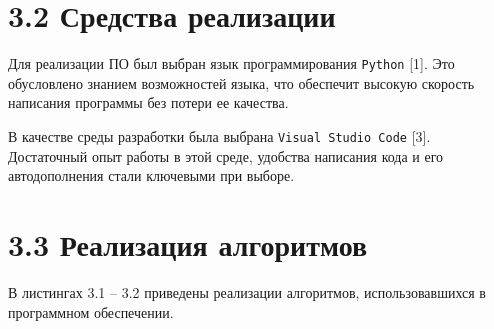 \documentclass[12pt, a4paper]{report}
\begin{document}
	\section*{3.2 Средства реализации}
	
	Для реализации ПО был выбран язык программирования \verb|Python| [1]. Это обусловлено знанием возможностей языка, что обеспечит высокую скорость написания программы без потери ее качества. 
	
	В качестве среды разработки была выбрана \verb|Visual Studio Code| [3]. Достаточный опыт работы в этой среде, удобства написания кода и его автодополнения стали ключевыми при выборе.
	
	\section*{3.3 Реализация алгоритмов}
	
	В листингах 3.1 -- 3.2 приведены реализации алгоритмов, использовавшихся в программном обеспечении.
\end{document}

